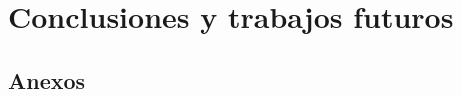 \documentclass[spanish, a4paper, 12pt, twoside, openany]{book}
\numberwithin{equation}{section} %
\begin{document}
\chapter{Conclusiones y trabajos futuros}
    
\clearpage

\newpage
{}
\renewcommand\refname{References} %
{%
\printbibliography %
}

\newpage
{}
\thispagestyle{empty} %
\section*{Anexos}


\thispagestyle{empty} %
\end{document}
